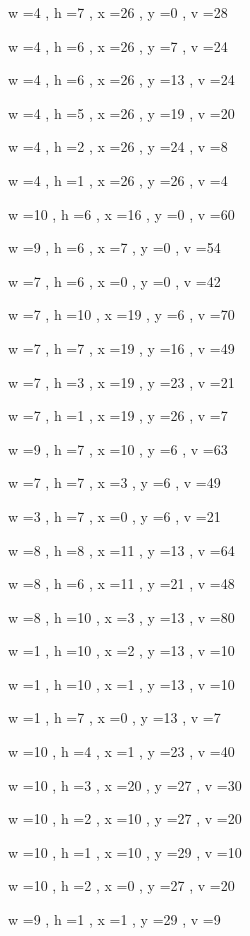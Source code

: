 \documentclass[11pt]{article}
\begin{document}


w =4 , h =7 , x =26 , y =0 , v =28
\par
w =4 , h =6 , x =26 , y =7 , v =24
\par
w =4 , h =6 , x =26 , y =13 , v =24
\par
w =4 , h =5 , x =26 , y =19 , v =20
\par
w =4 , h =2 , x =26 , y =24 , v =8
\par
w =4 , h =1 , x =26 , y =26 , v =4
\par
w =10 , h =6 , x =16 , y =0 , v =60
\par
w =9 , h =6 , x =7 , y =0 , v =54
\par
w =7 , h =6 , x =0 , y =0 , v =42
\par
w =7 , h =10 , x =19 , y =6 , v =70
\par
w =7 , h =7 , x =19 , y =16 , v =49
\par
w =7 , h =3 , x =19 , y =23 , v =21
\par
w =7 , h =1 , x =19 , y =26 , v =7
\par
w =9 , h =7 , x =10 , y =6 , v =63
\par
w =7 , h =7 , x =3 , y =6 , v =49
\par
w =3 , h =7 , x =0 , y =6 , v =21
\par
w =8 , h =8 , x =11 , y =13 , v =64
\par
w =8 , h =6 , x =11 , y =21 , v =48
\par
w =8 , h =10 , x =3 , y =13 , v =80
\par
w =1 , h =10 , x =2 , y =13 , v =10
\par
w =1 , h =10 , x =1 , y =13 , v =10
\par
w =1 , h =7 , x =0 , y =13 , v =7
\par
w =10 , h =4 , x =1 , y =23 , v =40
\par
w =10 , h =3 , x =20 , y =27 , v =30
\par
w =10 , h =2 , x =10 , y =27 , v =20
\par
w =10 , h =1 , x =10 , y =29 , v =10
\par
w =10 , h =2 , x =0 , y =27 , v =20
\par
w =9 , h =1 , x =1 , y =29 , v =9
\par
\newpage
\end{document}
